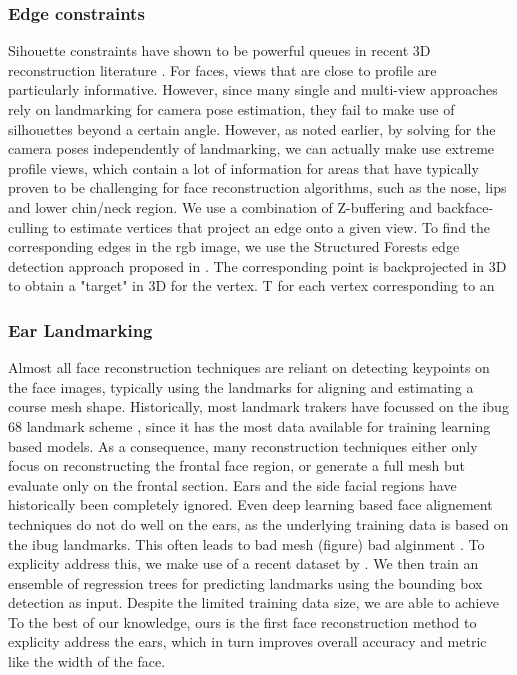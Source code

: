 \documentclass[10pt,twocolumn,letterpaper]{article}
\begin{document}
\subsubsection{Edge constraints}
Sihouette constraints have shown to be powerful queues in recent 3D reconstruction literature \cite{alldieck2018detailed,bas2016fitting}. For faces, views that are close to profile are particularly informative. However, since many single and multi-view approaches rely on landmarking for camera pose estimation, they fail to make use of silhouettes beyond a certain angle.
However, as noted earlier, by solving for the camera poses independently of landmarking, we can actually make use extreme profile views, which contain a lot of information for  areas that have typically proven to be challenging for face reconstruction algorithms, such as the nose, lips and lower chin/neck region.
We use a combination of Z-buffering \cite{Foley1990ComputerG} and backface-culling  to estimate vertices that project an edge onto a given view. To find the corresponding edges in the rgb image, we use the Structured Forests edge detection approach proposed in \cite{dollar2013structured}. The corresponding point is backprojected in 3D to obtain a "target" in 3D for the vertex.
T for each vertex corresponding to an 

\subsubsection{Ear Landmarking}

Almost all face reconstruction techniques are reliant on detecting keypoints on the face images, typically using the landmarks for aligning and estimating a course mesh shape.
Historically, most landmark trakers have focussed on the ibug 68 landmark scheme \cite{}, since it has the most data available for training learning based models. As a consequence, many reconstruction techniques either only focus on reconstructing the frontal face region, or generate a full mesh but evaluate only on the frontal section. Ears and the side facial regions have historically been completely ignored. Even deep learning based face alignement techniques do not do well on the ears, as the underlying training data is based on the ibug landmarks. This often leads to bad mesh (figure) bad alginment . 
To explicity address this, we make use of a recent dataset by . We then train an ensemble of regression trees \cite{} for predicting landmarks using the bounding box detection as input. Despite the limited training data size, we are able to achieve
To the best of our knowledge, ours is the first face reconstruction method to explicity address the ears, which in turn improves overall accuracy and metric like the width of the face.
\end{document}
